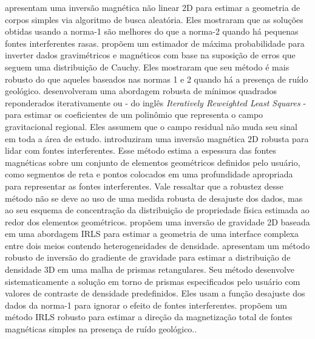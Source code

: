 \citet{silva_hohmann1983} apresentam uma inversão magnética não linear 2D para estimar a geometria de corpos simples via algoritmo de busca aleatória. Eles mostraram que as soluções obtidas usando a norma-1 são melhores do que a norma-2 quando há pequenas fontes interferentes rasas. 
\citet{silva_cutrim1989} propõem um estimador de máxima probabilidade para inverter dados gravimétricos e magnéticos com base na suposição de erros que seguem uma distribuição de Cauchy.
Eles mostraram que seu método é mais robusto do que aqueles baseados nas normas 1 e 2 quando há a presença de ruído geológico.
\citet{beltrao_etal1991} desenvolveram uma abordagem robusta de mínimos quadrados reponderados iterativamente ou - do inglês \textit{Iteratively Reweighted Least Squares} - \citep{scales_gersztenkorn1988} para estimar os coeficientes de um polinômio que representa o campo gravitacional regional. 
Eles assumem que o campo residual não muda seu sinal em toda a área de estudo. 
\citet{barbosa_silva2006} introduziram uma inversão magnética 2D robusta para lidar com fontes interferentes. Esse método estima a espessura das fontes magnéticas sobre um conjunto de elementos geométricos definidos pelo usuário, como segmentos de reta e pontos colocados em uma profundidade apropriada para representar as fontes interferentes. 
Vale ressaltar que a robustez desse método não se deve ao uso de uma medida robusta de desajuste dos dados, mas ao seu esquema de concentração da distribuição de propriedade física estimada ao redor dos elementos geométricos. 
\citet{silva_dias_etal2007} propõem uma inversão de gravidade 2D baseada em uma abordagem IRLS para estimar a geometria de uma interface complexa entre dois meios contendo
heterogeneidades de densidade. 
\citet{uieda_barbosa2012} apresentam um método robusto de inversão do gradiente de gravidade para estimar a distribuição de densidade 3D em uma malha de prismas retangulares.
Seu método desenvolve sistematicamente a solução em torno de prismas especificados pelo usuário com valores de contraste de densidade predefinidos. Eles usam a função desajuste dos dados da norma-1 para ignorar o efeito de fontes interferentes.
\citet{oliveirajr_etal2015} propõem um método IRLS robusto para estimar a direção da magnetização total de fontes magnéticas simples na presença de ruído geológico..

